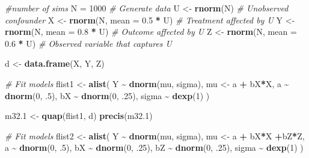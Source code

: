 \documentclass[
]{book}
\newenvironment{Shaded}{\begin{snugshade}}{\end{snugshade}}
\newcommand{\AttributeTok}[1]{\textcolor[rgb]{0.13,0.29,0.53}{#1}}
\newcommand{\CommentTok}[1]{\textcolor[rgb]{0.56,0.35,0.01}{\textit{#1}}}
\newcommand{\DecValTok}[1]{\textcolor[rgb]{0.00,0.00,0.81}{#1}}
\newcommand{\FloatTok}[1]{\textcolor[rgb]{0.00,0.00,0.81}{#1}}
\newcommand{\FunctionTok}[1]{\textcolor[rgb]{0.13,0.29,0.53}{\textbf{#1}}}
\newcommand{\NormalTok}[1]{#1}
\newcommand{\OtherTok}[1]{\textcolor[rgb]{0.56,0.35,0.01}{#1}}
\newcommand{\SpecialCharTok}[1]{\textcolor[rgb]{0.81,0.36,0.00}{\textbf{#1}}}
\begin{document}
\begin{Shaded}
\begin{Highlighting}[]
\CommentTok{\#number of sims}
\NormalTok{N }\OtherTok{=} \DecValTok{1000}
\CommentTok{\# Generate data}
\NormalTok{U }\OtherTok{\textless{}{-}} \FunctionTok{rnorm}\NormalTok{(N)  }\CommentTok{\# Unobserved confounder}
\NormalTok{X }\OtherTok{\textless{}{-}} \FunctionTok{rnorm}\NormalTok{(N, }\AttributeTok{mean =} \FloatTok{0.5} \SpecialCharTok{*}\NormalTok{ U)  }\CommentTok{\# Treatment affected by U}
\NormalTok{Y }\OtherTok{\textless{}{-}} \FunctionTok{rnorm}\NormalTok{(N, }\AttributeTok{mean =} \FloatTok{0.8} \SpecialCharTok{*}\NormalTok{ U)  }\CommentTok{\# Outcome affected by U}
\NormalTok{Z }\OtherTok{\textless{}{-}} \FunctionTok{rnorm}\NormalTok{(N, }\AttributeTok{mean =} \FloatTok{0.6} \SpecialCharTok{*}\NormalTok{ U)  }\CommentTok{\# Observed variable that captures U}

\NormalTok{d }\OtherTok{\textless{}{-}} \FunctionTok{data.frame}\NormalTok{(X, Y, Z)}

\CommentTok{\# Fit models}
\NormalTok{flist1 }\OtherTok{\textless{}{-}} \FunctionTok{alist}\NormalTok{(}
\NormalTok{  Y }\SpecialCharTok{\textasciitilde{}} \FunctionTok{dnorm}\NormalTok{(mu, sigma),}
\NormalTok{  mu }\OtherTok{\textless{}{-}}\NormalTok{ a }\SpecialCharTok{+}\NormalTok{ bX}\SpecialCharTok{*}\NormalTok{X,}
\NormalTok{  a }\SpecialCharTok{\textasciitilde{}} \FunctionTok{dnorm}\NormalTok{(}\DecValTok{0}\NormalTok{, .}\DecValTok{5}\NormalTok{),}
\NormalTok{  bX }\SpecialCharTok{\textasciitilde{}} \FunctionTok{dnorm}\NormalTok{(}\DecValTok{0}\NormalTok{, .}\DecValTok{25}\NormalTok{),}
\NormalTok{  sigma }\SpecialCharTok{\textasciitilde{}} \FunctionTok{dexp}\NormalTok{(}\DecValTok{1}\NormalTok{)}
\NormalTok{)}

\NormalTok{m32}\FloatTok{.1} \OtherTok{\textless{}{-}} \FunctionTok{quap}\NormalTok{(flist1, d)}
\FunctionTok{precis}\NormalTok{(m32}\FloatTok{.1}\NormalTok{)}

\CommentTok{\# Fit models}
\NormalTok{flist2 }\OtherTok{\textless{}{-}} \FunctionTok{alist}\NormalTok{(}
\NormalTok{  Y }\SpecialCharTok{\textasciitilde{}} \FunctionTok{dnorm}\NormalTok{(mu, sigma),}
\NormalTok{  mu }\OtherTok{\textless{}{-}}\NormalTok{ a }\SpecialCharTok{+}\NormalTok{ bX}\SpecialCharTok{*}\NormalTok{X }\SpecialCharTok{+}\NormalTok{bZ}\SpecialCharTok{*}\NormalTok{Z,}
\NormalTok{  a }\SpecialCharTok{\textasciitilde{}} \FunctionTok{dnorm}\NormalTok{(}\DecValTok{0}\NormalTok{, .}\DecValTok{5}\NormalTok{),}
\NormalTok{  bX }\SpecialCharTok{\textasciitilde{}} \FunctionTok{dnorm}\NormalTok{(}\DecValTok{0}\NormalTok{, .}\DecValTok{25}\NormalTok{),}
\NormalTok{  bZ }\SpecialCharTok{\textasciitilde{}} \FunctionTok{dnorm}\NormalTok{(}\DecValTok{0}\NormalTok{, .}\DecValTok{25}\NormalTok{),}
\NormalTok{  sigma }\SpecialCharTok{\textasciitilde{}} \FunctionTok{dexp}\NormalTok{(}\DecValTok{1}\NormalTok{)}
\NormalTok{)}


\end{Highlighting}
\end{Shaded}
\end{document}
